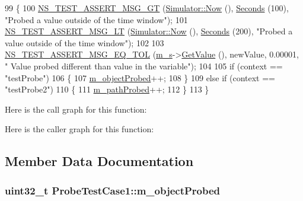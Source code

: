 \begin{DoxyCode}
99 \{
100   \hyperlink{group__testing_ga868cfb773df312b867a506bdd2e3cbef}{NS\_TEST\_ASSERT\_MSG\_GT} (\hyperlink{group__simulator_gac3635e2e87f7ce316c89290ee1b01d0d}{Simulator::Now} (), 
      \hyperlink{group__timecivil_ga33c34b816f8ff6628e33d5c8e9713b9e}{Seconds} (100), \textcolor{stringliteral}{"Probed a value outside of the time window"});
101   \hyperlink{group__testing_ga1d96848b91407c9a0b36583e8b0ad7ae}{NS\_TEST\_ASSERT\_MSG\_LT} (\hyperlink{group__simulator_gac3635e2e87f7ce316c89290ee1b01d0d}{Simulator::Now} (), 
      \hyperlink{group__timecivil_ga33c34b816f8ff6628e33d5c8e9713b9e}{Seconds} (200), \textcolor{stringliteral}{"Probed a value outside of the time window"});
102 
103   \hyperlink{group__testing_ga9e7861b56b4e70db3b56044cb7a28e41}{NS\_TEST\_ASSERT\_MSG\_EQ\_TOL} (\hyperlink{classProbeTestCase1_a982ddaa77f28cc097601f056e2174ec3}{m\_s}->\hyperlink{classSampleEmitter_acfe8e5fe0c3d69294169dfcbdea1feae}{GetValue} (), newValue, 0.00001, \textcolor{stringliteral}{"
      Value probed different than value in the variable"});
104 
105   \textcolor{keywordflow}{if} (context == \textcolor{stringliteral}{"testProbe"})
106     \{
107       \hyperlink{classProbeTestCase1_ac09be6977693c6332bfcc9a68dd7c0a9}{m\_objectProbed}++;
108     \}
109   \textcolor{keywordflow}{else} \textcolor{keywordflow}{if} (context == \textcolor{stringliteral}{"testProbe2"})
110     \{
111       \hyperlink{classProbeTestCase1_a40dc8f26332f36646863aeceb9f101ee}{m\_pathProbed}++;
112     \}
113 \}
\end{DoxyCode}


Here is the call graph for this function\+:




Here is the caller graph for this function\+:




\subsection{Member Data Documentation}
\subsubsection[{\texorpdfstring{m\+\_\+object\+Probed}{m_objectProbed}}]{\setlength{\rightskip}{0pt plus 5cm}uint32\+\_\+t Probe\+Test\+Case1\+::m\+\_\+object\+Probed\hspace{0.3cm}{\ttfamily [private]}}\hypertarget{classProbeTestCase1_ac09be6977693c6332bfcc9a68dd7c0a9}{}\label{classProbeTestCase1_ac09be6977693c6332bfcc9a68dd7c0a9}
